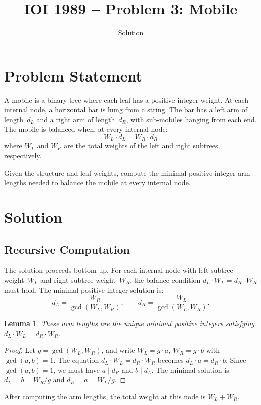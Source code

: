 \documentclass[11pt,a4paper]{article}
\title{IOI 1989 -- Problem 3: Mobile}
\author{Solution}
\date{}
\newtheorem{lemma}[theorem]{Lemma}
\begin{document}
\maketitle

\section{Problem Statement}

A mobile is a binary tree where each leaf has a positive integer weight. At
each internal node, a horizontal bar is hung from a string. The bar has a left
arm of length~$d_L$ and a right arm of length~$d_R$, with sub-mobiles hanging
from each end. The mobile is balanced when, at every internal node:
\[
  W_L \cdot d_L = W_R \cdot d_R
\]
where $W_L$ and $W_R$ are the total weights of the left and right subtrees,
respectively.

Given the structure and leaf weights, compute the minimal positive integer arm
lengths needed to balance the mobile at every internal node.

\section{Solution}

\subsection{Recursive Computation}

The solution proceeds bottom-up. For each internal node with left subtree
weight~$W_L$ and right subtree weight~$W_R$, the balance condition
$d_L \cdot W_L = d_R \cdot W_R$ must hold. The minimal positive integer
solution is:
\[
  d_L = \frac{W_R}{\gcd(W_L, W_R)}, \qquad
  d_R = \frac{W_L}{\gcd(W_L, W_R)}.
\]

\begin{lemma}
These arm lengths are the unique minimal positive integers satisfying
$d_L \cdot W_L = d_R \cdot W_R$.
\end{lemma}
\begin{proof}
Let $g = \gcd(W_L, W_R)$, and write $W_L = g \cdot a$, $W_R = g \cdot b$
with $\gcd(a, b) = 1$. The equation $d_L \cdot W_L = d_R \cdot W_R$ becomes
$d_L \cdot a = d_R \cdot b$. Since $\gcd(a,b) = 1$, we must have $a \mid d_R$
and $b \mid d_L$. The minimal solution is $d_L = b = W_R / g$ and
$d_R = a = W_L / g$.
\end{proof}

After computing the arm lengths, the total weight at this node is $W_L + W_R$.
\end{document}
